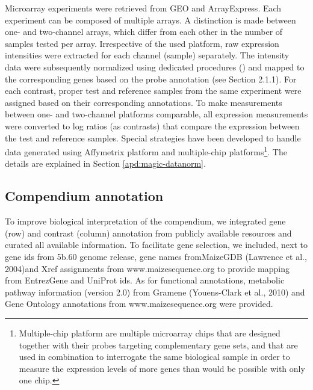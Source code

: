 Microarray experiments were retrieved from GEO and ArrayExpress. Each 
experiment can be composed of multiple arrays. 
A distinction is made between one- and two-channel arrays, which differ from 
each other in the number of samples tested per array. 
Irrespective of the used platform, raw expression intensities were extracted 
for each channel (sample) separately. 
The intensity data were subsequently normalized using dedicated procedures 
(\cite{Engelen2011}) and mapped to the corresponding genes based on the probe 
annotation (see Section 2.1.1). 
For each contrast, proper test and reference samples from the same experiment 
were assigned based on their corresponding annotations. 
To make measurements between one- and two-channel platforms comparable, all
expression measurements were converted to log ratios (as contrasts) that
compare the expression between the test and reference samples.
Special strategies have been developed to handle data generated using 
Affymetrix platform and multiple-chip platforms\footnote{Multiple-chip platform 
are multiple microarray chips that are designed together with their probes 
targeting complementary gene sets, and that are used in combination to 
interrogate the same biological sample in order to measure the expression 
levels of more genes than would be possible with only one chip.}. 
The details are explained in Section \ref{apd:magic-datanorm}.


\subsection{Compendium annotation}

To improve biological interpretation of the compendium, we integrated
gene (row) and contrast (column) annotation from publicly available 
resources and curated all available information.
To facilitate gene selection, we included, next to gene ids from 5b.60
genome release, gene names fromMaizeGDB (Lawrence et al., 2004)and
Xref assignments from www.maizesequence.org to provide mapping from
EntrezGene and UniProt ids. As for functional annotations, metabolic
pathway information (version 2.0) from Gramene (Youens-Clark et al.,
2010) and Gene Ontology annotations from www.maizesequence.org
were provided.

